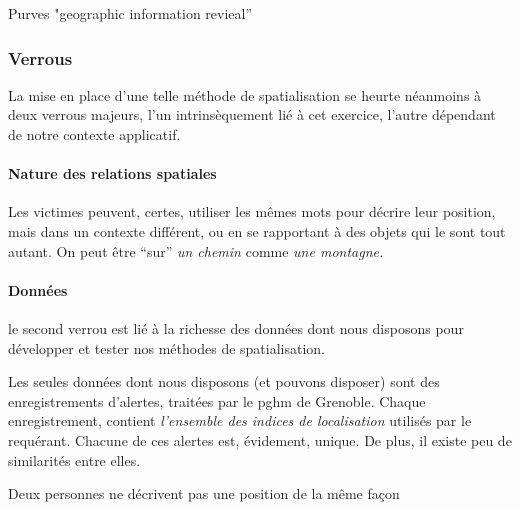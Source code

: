 Purves "geographic information revieal''

\subsubsection{Verrous}

La mise en place d'une telle méthode de spatialisation se heurte
néanmoins à deux verrous majeurs, l'un intrinsèquement lié à cet
exercice, l'autre dépendant de notre contexte applicatif.

\paragraph{Nature des relations spatiales}

Les victimes peuvent, certes, utiliser les mêmes mots pour décrire
leur position, mais dans un contexte différent, ou en se rapportant à
des objets qui le sont tout autant. On peut être \enquote{sur}
\emph{un chemin} comme \emph{une montagne.}

\paragraph{Données}

le second verrou est lié à la richesse des données dont nous disposons
pour développer et tester nos méthodes de spatialisation.

Les seules données dont nous disposons (et pouvons disposer) sont des
enregistrements d'alertes, traitées par le \ac{pghm} de
Grenoble. Chaque enregistrement, contient \emph{l'ensemble des indices
  de localisation} utilisés par le requérant. Chacune de ces alertes
est, évidement, unique. De plus, il existe peu de similarités entre
elles.





Deux personnes ne décrivent pas une position de la même façon



